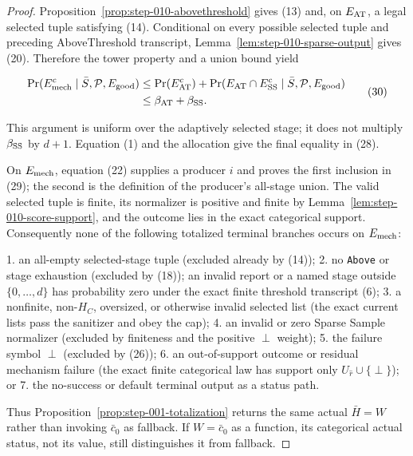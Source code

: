 \begin{proof}
Proposition~\ref{prop:step-010-abovethreshold} gives (13) and,
on \(E_{\rm AT}\), a legal selected tuple satisfying (14). Conditional on
every possible selected tuple and preceding AboveThreshold transcript,
Lemma~\ref{lem:step-010-sparse-output} gives (20). Therefore the tower
property and a union bound yield

\[
\begin{aligned}
 \Pr(E_{\rm mech}^c\mid\bar S,\mathcal P,E_{\rm good})
 &\leq\Pr(E_{\rm AT}^c)
   +\Pr(E_{\rm AT}\cap E_{\rm SS}^c
        \mid\bar S,\mathcal P,E_{\rm good})\\
 &\leq\beta_{\rm AT}+\beta_{\rm SS}.
\end{aligned}
 \tag{30}
\]

This argument is uniform over the adaptively selected stage; it does not
multiply \(\beta_{\rm SS}\) by \(d+1\). Equation (1) and the 
allocation give the final equality in (28).

On \(E_{\rm mech}\), equation (22) supplies a producer \(i\) and proves the
first inclusion in (29); the second is the definition of the producer's
all-stage union. The valid selected tuple is finite, its normalizer
is positive and finite by Lemma~\ref{lem:step-010-score-support}, and the
outcome lies in the exact categorical support. Consequently none of the
following totalized terminal branches occurs on \(E_{\rm mech}\):

1. an all-empty selected-stage tuple (excluded already by (14));
2. no \texttt{Above} or stage exhaustion (excluded by (18)); an invalid report or
   a named stage outside \(\{0,\ldots,d\}\) has probability zero under the
   exact finite threshold transcript (6);
3. a nonfinite, non-\(H_C\), oversized, or otherwise invalid selected list
   (the  exact current lists pass the sanitizer and obey the cap);
4. an invalid or zero Sparse Sample normalizer (excluded by finiteness and
   the positive \(\perp\) weight);
5. the failure symbol \(\perp\) (excluded by (26));
6. an out-of-support outcome or residual mechanism failure (the exact
   finite categorical law has support only
   \(U_{\widehat r}\cup\{\perp\}\)); or
7. the no-success or default terminal output as a status path.

Thus Proposition~\ref{prop:step-001-totalization} returns the same
actual \(\bar H=W\) rather than invoking \(\bar c_0\) as fallback. If
\(W=\bar c_0\) as a function, its categorical actual status, not its value,
still distinguishes it from fallback.


\end{proof}
